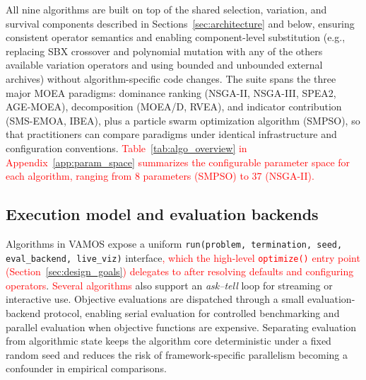 \documentclass[journal]{IEEEtran}
\newcommand{\VAMOS}{VAMOS}
\begin{document}
All nine algorithms are built on top of the shared selection, variation, and survival components described in Sections~\ref{sec:architecture} and below, ensuring consistent operator semantics and enabling component-level substitution (e.g., replacing SBX crossover and polynomial mutation with any of the others available variation operators and using bounded and unbounded external archives) without algorithm-specific code changes. The suite spans the three major MOEA paradigms: dominance ranking (NSGA-II, NSGA-III, SPEA2, AGE-MOEA), decomposition (MOEA/D, RVEA), and indicator contribution (SMS-EMOA, IBEA), plus a particle swarm optimization algorithm (SMPSO), so that practitioners can compare paradigms under identical infrastructure and configuration conventions. \textcolor{red}{Table~\ref{tab:algo_overview} in Appendix~\ref{app:param_space} summarizes the configurable parameter space for each algorithm, ranging from 8 parameters (SMPSO) to 37 (NSGA-II).}


\subsection{Execution model and evaluation backends}

Algorithms in \VAMOS{} expose a uniform \texttt{run(problem, termination, seed, eval\_backend, live\_viz)} interface\textcolor{red}{, which the high-level \texttt{optimize()} entry point (Section~\ref{sec:design_goals}) delegates to after resolving defaults and configuring operators}. \textcolor{red}{Several algorithms} also support an \emph{ask--tell} loop for streaming or interactive use. Objective evaluations are dispatched through a small evaluation-backend protocol, enabling serial evaluation for controlled benchmarking and parallel evaluation when objective functions are expensive. Separating evaluation from algorithmic state keeps the algorithm core deterministic under a fixed random seed and reduces the risk of framework-specific parallelism becoming a confounder in empirical comparisons.
\end{document}
